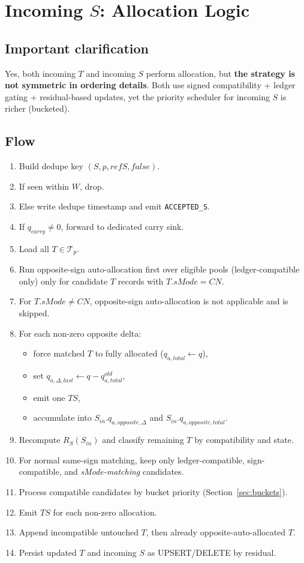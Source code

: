 \documentclass[sigconf]{acmart}
\begin{document}
\section{Incoming $S$: Allocation Logic}\label{sec:incoming-s}
\subsection{Important clarification}
Yes, both incoming $T$ and incoming $S$ perform allocation, but \textbf{the strategy is not symmetric in ordering details}.
Both use signed compatibility + ledger gating + residual-based updates, yet the priority scheduler for incoming $S$ is richer (bucketed).

\subsection{Flow}
\begin{enumerate}[leftmargin=*]
  \item Build dedupe key $(S,p,refS,false)$.
  \item If seen within $W$, drop.
  \item Else write dedupe timestamp and emit \texttt{ACCEPTED\_S}.
  \item If $q_{carry}\neq 0$, forward to dedicated carry sink.
  \item Load all $T\in\mathcal{T}_p$.
  \item Run opposite-sign auto-allocation first over eligible pools (ledger-compatible only) only for candidate $T$ records with $T.sMode=CN$.
  \item For $T.sMode\neq CN$, opposite-sign auto-allocation is not applicable and is skipped.
  \item For each non-zero opposite delta:
  \begin{itemize}[leftmargin=*]
    \item force matched $T$ to fully allocated ($q_{a,total}\gets q$),
    \item set $q_{a,\Delta,last}\gets q-q_{a,total}^{old}$,
    \item emit one $TS$,
    \item accumulate into $S_{in}.q_{a,opposite,\Delta}$ and $S_{in}.q_{a,opposite,total}$.
  \end{itemize}
  \item Recompute $R_S(S_{in})$ and classify remaining $T$ by compatibility and state.
  \item For normal same-sign matching, keep only ledger-compatible, sign-compatible, and \emph{sMode-matching} candidates.
  \item Process compatible candidates by bucket priority (Section~\ref{sec:buckets}).
  \item Emit $TS$ for each non-zero allocation.
  \item Append incompatible untouched $T$, then already opposite-auto-allocated $T$.
  \item Persist updated $T$ and incoming $S$ as UPSERT/DELETE by residual.
\end{enumerate}
\end{document}
